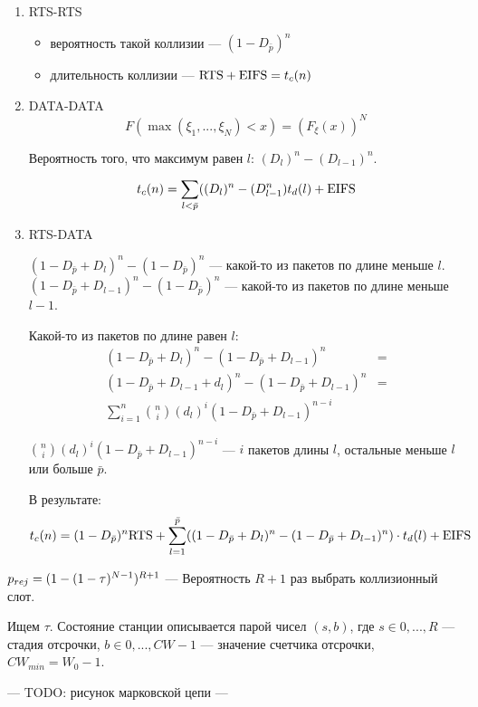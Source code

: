 \begin{enumerate}
\item RTS-RTS

\begin{itemize}
\item вероятность такой коллизии --- $(1 - D_{\bar{p}})^n$
\item длительность коллизии --- $\text{RTS} + \text{EIFS} = t_c(n)$
\end{itemize}

\item DATA-DATA
\[ F(\max(\xi_1, ..., \xi_N) < x) = (F_\xi (x))^N \]

Вероятность того, что максимум равен $l$: $(D_l)^n - (D_{l-1})^n$.

\[
t_c(n) = \sum_{l < \bar{p}} ((D_l)^n - (D_{l-1}^n) t_d(l) + \text{EIFS}
\]

\item RTS-DATA

$(1 - D_{\bar{p}} + D_l)^n - (1 - D_{\bar{p}})^n$ --- какой-то из пакетов по длине меньше $l$.
$(1 - D_{\bar{p}} + D_{l-1})^n - (1 - D_{\bar{p}})^n$ --- какой-то из пакетов по длине меньше $l - 1$.

Какой-то из пакетов по длине равен $l$:
\begin{align*}
(1 - D_{\bar{p}} + D_l)^n  - (1 - D_{\bar{p}} + D_{l-1})^n &= \\
(1 - D_{\bar{p}} + D_{l - 1} + d_l)^n - (1 - D_{\bar{p}} + D_{l - 1})^n &= \\
\sum_{i = 1}^n {{n \choose i} (d_l)^i (1 - D_{\bar{p}} + D_{l - 1})^{n - i}} &
\end{align*}

${n \choose i} (d_l)^i (1 - D_{\bar{p}} + D_{l - 1})^{n - i}$ --- $i$ пакетов длины $l$, остальные меньше $l$ или больше $\bar{p}$.

В результате:
\[
t_c(n) = (1 - D_{\bar{p}})^n \text{RTS} + \sum_{l = 1}^{\bar{p}} ((1 - D_{\bar{p}} + D_l)^n - (1 - D_{\bar{p}} + D_{l - 1})^n) \cdot t_d(l) + \text{EIFS}
\]
\end{enumerate}

$p_{rej} = (1 - (1 - \tau)^{N - 1})^{R + 1}$ --- Вероятность $R + 1$ раз выбрать коллизионный слот.

Ищем $\tau$.  Состояние станции описывается парой чисел $(s, b)$, где $s \in 0, ..., R$ --- стадия отсрочки, $b \in 0, ..., CW - 1$ --- значение счетчика отсрочки, $CW_{min} = W_0 - 1$.

--- TODO: рисунок марковской цепи ---

